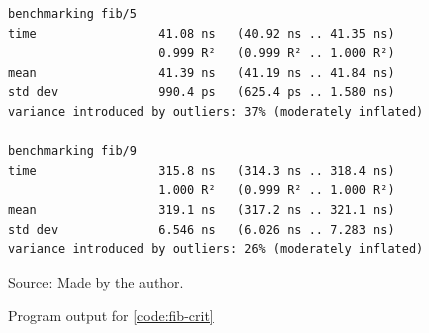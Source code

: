 \begin{figure}[htp]
  \centering
  \caption{Program output for \autoref{code:fib-crit}}
  \begin{Verbatim}[fontsize=\small]
benchmarking fib/5
time                 41.08 ns   (40.92 ns .. 41.35 ns)
                     0.999 R²   (0.999 R² .. 1.000 R²)
mean                 41.39 ns   (41.19 ns .. 41.84 ns)
std dev              990.4 ps   (625.4 ps .. 1.580 ns)
variance introduced by outliers: 37% (moderately inflated)

benchmarking fib/9
time                 315.8 ns   (314.3 ns .. 318.4 ns)
                     1.000 R²   (0.999 R² .. 1.000 R²)
mean                 319.1 ns   (317.2 ns .. 321.1 ns)
std dev              6.546 ns   (6.026 ns .. 7.283 ns)
variance introduced by outliers: 26% (moderately inflated)
  \end{Verbatim}
  \footnotesize{Source: Made by the author.}
  \label{fig:fib-output}
\end{figure}
